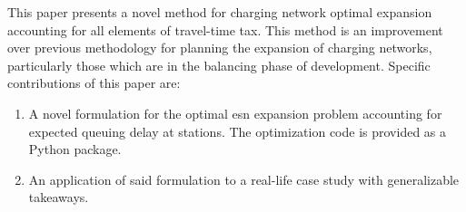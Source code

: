 This paper presents a novel method for charging network optimal expansion accounting for all elements of travel-time tax. This method is an improvement over previous methodology for planning the expansion of charging networks, particularly those which are in the balancing phase of development. Specific contributions of this paper are:

\begin{enumerate}
	\item A novel formulation for the optimal \gls{esn} expansion problem accounting for expected queuing delay at stations. The optimization code is provided as a Python package.
	\item An application of said formulation to a real-life case study with generalizable takeaways.
\end{enumerate}


